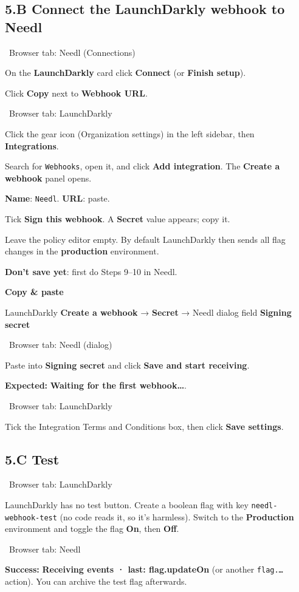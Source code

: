 \documentclass[11pt,a4paper]{article}
\newcommand{\ui}[1]{\textbf{#1}}
\newcommand{\where}[1]{\par\smallskip\noindent\colorbox{winbg}{\color{winfg}\bfseries\strut\ #1\ }\par\nopagebreak[4]}
\newcommand{\lit}[1]{\texttt{#1}}
\newenvironment{xfer}{\def\FrameCommand{\fboxsep=6pt\colorbox{xferbg}}\MakeFramed{\advance\hsize-\width\FrameRestore}\textbf{Copy \& paste}\par}{\endMakeFramed}
\begin{document}
\subsection*{5.B Connect the LaunchDarkly webhook to Needl}
\where{Browser tab: Needl (Connections)}
\begin{steps}
\item On the \ui{LaunchDarkly} card click \ui{Connect} (or \ui{Finish setup}).
\item Click \ui{Copy} next to \ui{Webhook URL}.
\end{steps}
\where{Browser tab: LaunchDarkly}
\begin{steps}[resume]
\item Click the gear icon (Organization settings) in the left sidebar, then \ui{Integrations}.
\item Search for \lit{Webhooks}, open it, and click \ui{Add integration}. The \ui{Create a webhook} panel opens.
\item \ui{Name}: \lit{Needl}. \ui{URL}: paste.
\item Tick \ui{Sign this webhook}. A \ui{Secret} value appears; copy it.
\item Leave the policy editor empty. By default LaunchDarkly then sends all flag changes in the \textbf{production} environment.
\item \textbf{Don't save yet}: first do Steps 9–10 in Needl.
\end{steps}
\begin{xfer}
LaunchDarkly \ui{Create a webhook} → \ui{Secret} → Needl dialog field \ui{Signing secret}
\end{xfer}
\where{Browser tab: Needl (dialog)}
\begin{steps}[resume]
\item Paste into \ui{Signing secret} and click \ui{Save and start receiving}.
\item \textbf{Expected:} \ui{Waiting for the first webhook…}.
\end{steps}
\where{Browser tab: LaunchDarkly}
\begin{steps}[resume]
\item Tick the Integration Terms and Conditions box, then click \ui{Save settings}.
\end{steps}

\subsection*{5.C Test}
\where{Browser tab: LaunchDarkly}
LaunchDarkly has no test button. Create a boolean flag with key \lit{needl-webhook-test} (no code reads it, so it's harmless). Switch to the \textbf{Production} environment and toggle the flag \ui{On}, then \ui{Off}.
\where{Browser tab: Needl}
\textbf{Success:} \ui{Receiving events · last: flag.updateOn} (or another \lit{flag.…} action). You can archive the test flag afterwards.
\end{document}
